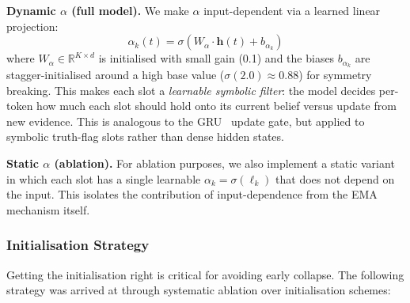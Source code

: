 \documentclass[conference]{IEEEtran}
\newcommand{\Real}{\mathbb{R}}
\begin{document}
\textbf{Dynamic $\alpha$ (full model).}
We make $\alpha$ input-dependent via a learned linear projection:
\begin{equation}
    \alpha_k(t) = \sigma\!\left(
    W_\alpha \cdot \mathbf{h}(t) + b_{\alpha_k}
    \right)
\label{eq:dynamic_alpha}
\end{equation}
where $W_\alpha \in \Real^{K \times d}$ is initialised with small
gain (0.1) and the biases $b_{\alpha_k}$ are stagger-initialised
around a high base value ($\sigma(2.0) \approx 0.88$) for symmetry
breaking. This makes each slot a \emph{learnable symbolic filter}:
the model decides per-token how much each slot should hold onto
its current belief versus update from new evidence. This is
analogous to the GRU~\cite{cho2014gru} update gate, but applied
to symbolic truth-flag slots rather than dense hidden states.

\textbf{Static $\alpha$ (ablation).}
For ablation purposes, we also implement a static variant in which
each slot has a single learnable $\alpha_k = \sigma(\ell_k)$
that does not depend on the input. This isolates the contribution
of input-dependence from the EMA mechanism itself.

\subsubsection{Initialisation Strategy}
\label{sec:init}

Getting the initialisation right is critical for avoiding early
collapse. The following strategy was arrived at through systematic
ablation over initialisation schemes:
\end{document}
